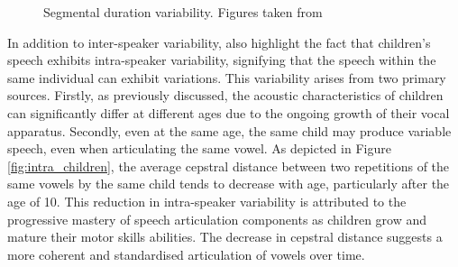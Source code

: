\begin{figure}[ht]
\centering
{}
\caption{Segmental duration variability. Figures taken from \cite{Acoustic_change_children}}
\end{figure}


In addition to inter-speaker variability, \cite{Acoustic_change_children} also highlight the fact that children's speech exhibits intra-speaker variability, signifying that the speech within the same individual can exhibit variations. This variability arises from two primary sources. Firstly, as previously discussed, the acoustic characteristics of children can significantly differ at different ages due to the ongoing growth of their vocal apparatus.  Secondly, even at the same age, the same child may produce variable speech, even when articulating the same vowel. As depicted in Figure \ref{fig:intra_children}, the average cepstral distance between two repetitions of the same vowels by the same child tends to decrease with age, particularly after the age of 10. This reduction in intra-speaker variability is attributed to the progressive mastery of speech articulation components as children grow and mature their motor skills abilities. The decrease in cepstral distance suggests a more coherent and standardised articulation of vowels over time.

